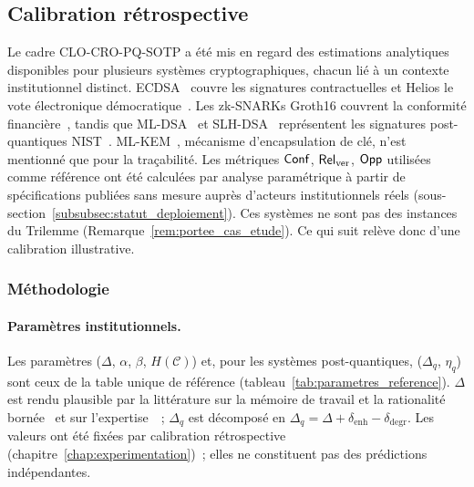 \subsection{Calibration r\'etrospective}
\label{subsec:validation_theorique}
\begin{sloppypar}
Le cadre CLO-CRO-PQ-SOTP a \'et\'e mis en regard des estimations analytiques
disponibles pour plusieurs syst\`emes cryptographiques, chacun li\'e \`a un contexte
institutionnel distinct. ECDSA~\cite{Johnson01,NIST.FIPS.186-5} couvre les
signatures contractuelles et Helios le vote \'electronique
d\'emocratique~\cite{Adida08,Adida09UCL}. Les zk-SNARKs Groth16 couvrent la
conformit\'e financi\`ere~\cite{Groth16,Garratt15,BCTV14}, tandis que
ML-DSA~\cite{Dilithium2022,NIST.FIPS.204} et SLH-DSA~\cite{SPHINCS2022,NIST.FIPS.205}
repr\'esentent les signatures post-quantiques
NIST~\cite{NIST.PQ.Standardization,Chen2016,Alagic2022}. ML-KEM~\cite{Kyber2022,NIST.FIPS.203},
m\'ecanisme d'encapsulation de cl\'e, n'est mentionn\'e que pour la tra\c{c}abilit\'e.
Les m\'etriques $\mathsf{Conf}$, $\mathsf{Rel}_{\mathrm{ver}}$, $\mathsf{Opp}$ utilis\'ees comme r\'ef\'erence ont \'et\'e
calcul\'ees par analyse param\'etrique \`a partir de sp\'ecifications publi\'ees
sans mesure aupr\`es d'acteurs institutionnels r\'eels
(sous-section~\ref{subsubsec:statut_deploiement}). Ces syst\`emes ne sont pas des
instances du Trilemme (Remarque~\ref{rem:portee_cas_etude}). Ce qui suit
rel\`eve donc d'une calibration illustrative.

\subsubsection{M\'ethodologie}
\label{subsubsec:methodologie_validation}

\paragraph{Param\`etres institutionnels.}
Les param\`etres ($\Delta$, $\alpha$, $\beta$, $H(\mathcal{C})$) et, pour les
syst\`emes post-quantiques, ($\Delta_q$, $\eta_q$) sont ceux de la table unique
de r\'ef\'erence (tableau~\ref{tab:parametres_reference}). $\Delta$ est rendu
plausible par la litt\'erature sur la m\'emoire de travail et la rationalit\'e
born\'ee~\cite{Miller56,Cowan2001,Simon82,Simon1955} et sur l'expertise~\cite{Ericsson95,Chi2006}~;
$\Delta_q$ est d\'ecompos\'e en $\Delta_q = \Delta + \delta_{\text{enh}} - \delta_{\text{degr}}$.
Les valeurs ont \'et\'e fix\'ees par calibration r\'etrospective
(chapitre~\ref{chap:experimentation})~; elles ne constituent pas des pr\'edictions
ind\'ependantes.


\end{sloppypar}
